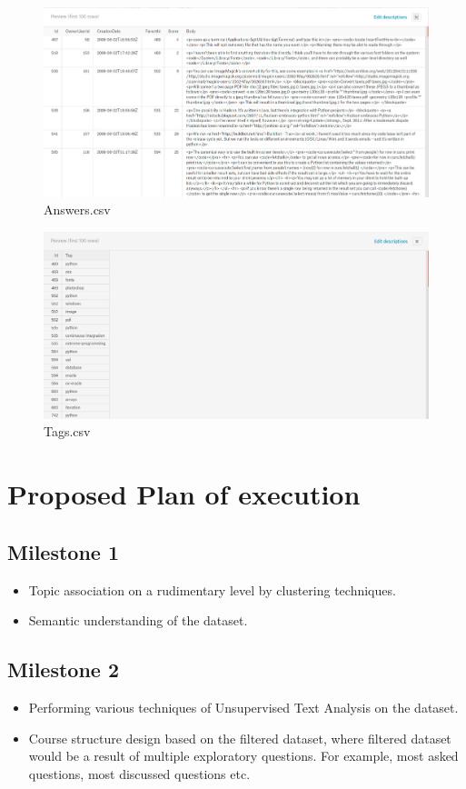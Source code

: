 \documentclass{article}
\begin{document}
\begin{figure}[h]
\centering
\includegraphics[width=14cm]{Answers}
\caption {Answers.csv}
\end{figure}


\begin{figure}[h]
\centering
\includegraphics[width=15cm]{Tags}
\caption {Tags.csv}
\end{figure}




\section{Proposed Plan of execution}

\subsection{Milestone 1}
\begin{itemize}
\item Topic association on a rudimentary level by clustering techniques. 
\item Semantic understanding of the dataset.
\end{itemize}

\subsection{Milestone 2}
\begin{itemize}
\item Performing various techniques of Unsupervised Text Analysis on the dataset. 

\item Course structure design based on the filtered dataset, where filtered dataset would be a result of multiple exploratory questions. For example, most asked questions, most discussed questions etc.
\end{itemize}
\end{document}
